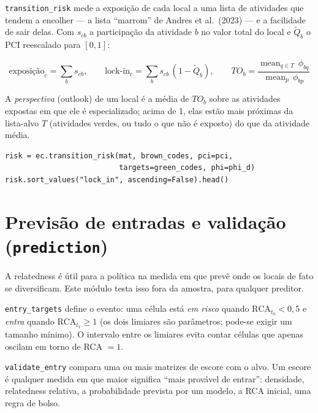 \documentclass[12pt, a4paper]{article}
\newcommand{\fn}[1]{\texttt{#1}}
\begin{document}
\begin{sloppypar}
\fn{transition\_risk} mede a exposi\c{c}\~{a}o de cada local a uma lista de
atividades que tendem a encolher --- a lista ``marrom'' de Andres et
al.\ (2023) --- e a facilidade de sair delas. Com $s_{cb}$ a
participa\c{c}\~{a}o da atividade $b$ no valor total do local e
$\widetilde{Q}_b$ o PCI reescalado para $[0,1]$:
\end{sloppypar}

\[
  \text{exposi\c{c}\~{a}o}_c = \sum_{b} s_{cb}, \qquad
  \text{lock-in}_c = \sum_{b} s_{cb}\,(1 - \widetilde{Q}_b), \qquad
  TO_b = \frac{\operatorname{mean}_{q \in T}\,\phi_{bq}}
              {\operatorname{mean}_{p}\,\phi_{bp}}
\]

A \emph{perspectiva} (outlook) de um local \'{e} a m\'{e}dia de $TO_b$ sobre
as atividades expostas em que ele \'{e} especializado; acima de 1, elas
est\~{a}o mais pr\'{o}ximas da lista-alvo $T$ (atividades verdes, ou tudo o
que n\~{a}o \'{e} exposto) do que da atividade m\'{e}dia.

\begin{lstlisting}[caption={Exposi\c{c}\~{a}o, lock-in e perspectiva de transi\c{c}\~{a}o}]
risk = ec.transition_risk(mat, brown_codes, pci=pci,
                          targets=green_codes, phi=phi_d)
risk.sort_values("lock_in", ascending=False).head()
\end{lstlisting}

\section{Previs\~{a}o de entradas e valida\c{c}\~{a}o (\texttt{prediction})}

A relatedness \'{e} \'{u}til para a pol\'{i}tica na medida em que prev\^{e}
onde os locais de fato se diversificam. Este m\'{o}dulo testa isso fora
da amostra, para qualquer preditor.

\fn{entry\_targets} define o evento: uma c\'{e}lula est\'{a} \emph{em
risco} quando $\text{RCA}_{t_0} < 0{,}5$ e \emph{entra} quando
$\text{RCA}_{t_1} \geq 1$ (os dois limiares s\~{a}o par\^{a}metros; pode-se
exigir um tamanho m\'{i}nimo). O intervalo entre os limiares evita contar
c\'{e}lulas que apenas oscilam em torno de RCA $= 1$.

\fn{validate\_entry} compara uma ou mais matrizes de escore com o alvo.
Um escore \'{e} qualquer medida em que maior significa ``mais prov\'{a}vel
de entrar'': densidade, relatedness relativa, a probabilidade prevista
por um modelo, a RCA inicial, uma regra de bolso.
\end{document}
